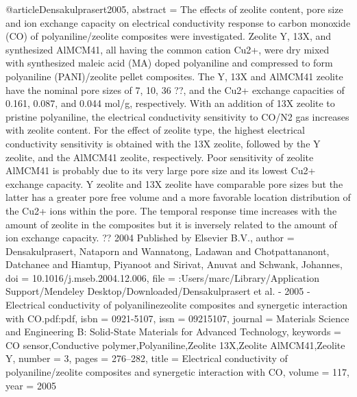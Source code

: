 @article{Densakulprasert2005,
abstract = {The effects of zeolite content, pore size and ion exchange capacity on electrical conductivity response to carbon monoxide (CO) of polyaniline/zeolite composites were investigated. Zeolite Y, 13X, and synthesized AlMCM41, all having the common cation Cu2+, were dry mixed with synthesized maleic acid (MA) doped polyaniline and compressed to form polyaniline (PANI)/zeolite pellet composites. The Y, 13X and AlMCM41 zeolite have the nominal pore sizes of 7, 10, 36 ??, and the Cu2+ exchange capacities of 0.161, 0.087, and 0.044 mol/g, respectively. With an addition of 13X zeolite to pristine polyaniline, the electrical conductivity sensitivity to CO/N2 gas increases with zeolite content. For the effect of zeolite type, the highest electrical conductivity sensitivity is obtained with the 13X zeolite, followed by the Y zeolite, and the AlMCM41 zeolite, respectively. Poor sensitivity of zeolite AlMCM41 is probably due to its very large pore size and its lowest Cu2+ exchange capacity. Y zeolite and 13X zeolite have comparable pore sizes but the latter has a greater pore free volume and a more favorable location distribution of the Cu2+ ions within the pore. The temporal response time increases with the amount of zeolite in the composites but it is inversely related to the amount of ion exchange capacity. ?? 2004 Published by Elsevier B.V.},
author = {Densakulprasert, Nataporn and Wannatong, Ladawan and Chotpattananont, Datchanee and Hiamtup, Piyanoot and Sirivat, Anuvat and Schwank, Johannes},
doi = {10.1016/j.mseb.2004.12.006},
file = {:Users/marc/Library/Application Support/Mendeley Desktop/Downloaded/Densakulprasert et al. - 2005 - Electrical conductivity of polyanilinezeolite composites and synergetic interaction with CO.pdf:pdf},
isbn = {0921-5107},
issn = {09215107},
journal = {Materials Science and Engineering B: Solid-State Materials for Advanced Technology},
keywords = {CO sensor,Conductive polymer,Polyaniline,Zeolite 13X,Zeolite AlMCM41,Zeolite Y},
number = {3},
pages = {276--282},
title = {{Electrical conductivity of polyaniline/zeolite composites and synergetic interaction with CO}},
volume = {117},
year = {2005}
}
